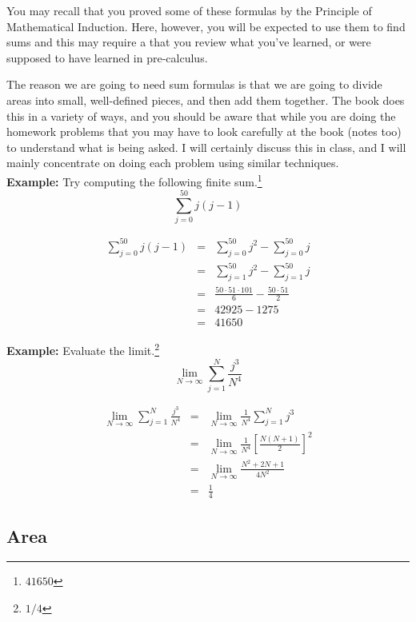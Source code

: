 \documentclass[12pt,addpoints, answers, fleqn]{exam}
\begin{document}
You may recall that you proved some of these formulas by the Principle of Mathematical Induction. Here, however, you will be expected to use them to find sums and this may require a that you review  what you've learned, or were supposed to have learned in pre-calculus.



The reason we are going to need sum formulas is that we are going to divide areas into small, well-defined pieces, and then add them together. The book does this in a variety of ways, and you should be aware that while you are doing the homework problems that you may have to look carefully at the book (notes too) to understand what is being asked. I will certainly discuss this in class, and I will mainly concentrate on doing each problem using similar techniques.\\
\textbf{Example:} Try computing the following finite sum.\footnote{$41650$}
\[
\sum_{j=0}^{50} j\left(j-1\right)
\]

\begin{solution}
\begin{eqnarray*}
\sum_{j=0}^{50} j\left(j-1\right) &=& \sum_{j=0}^{50} j^2 - \sum_{j=0}^{50} j\\
&=& \sum_{j=1}^{50} j^2 - \sum_{j=1}^{50} j\\
&=& \frac{50 \cdot 51 \cdot 101}{6} - \frac{50\cdot 51}{2}\\
&=& 42925-1275\\
&=& 41650
\end{eqnarray*}
\end{solution}

\textbf{Example:}  Evaluate the limit.\footnote{$1/4$}
\[
\lim_{N \to \infty} \sum_{j=1}^N \frac{j^3}{N^4}
\]

\begin{solution}
\begin{eqnarray*}
\lim_{N \to \infty} \sum_{j=1}^N \frac{j^3}{N^4} &=& \lim_{N \to \infty} \frac{1}{N^4 }\sum_{j=1}^N j^3\\
&=&  \lim_{N \to \infty} \frac{1}{N^4 } \left[\frac{N\left(N+1\right)}{2} \right]^2\\
&=&  \lim_{N \to \infty} \frac{N^2+2N+1}{4N^2}\\
&=& \frac{1}{4}
\end{eqnarray*}
\end{solution}

\subsection{Area}
\end{document}
